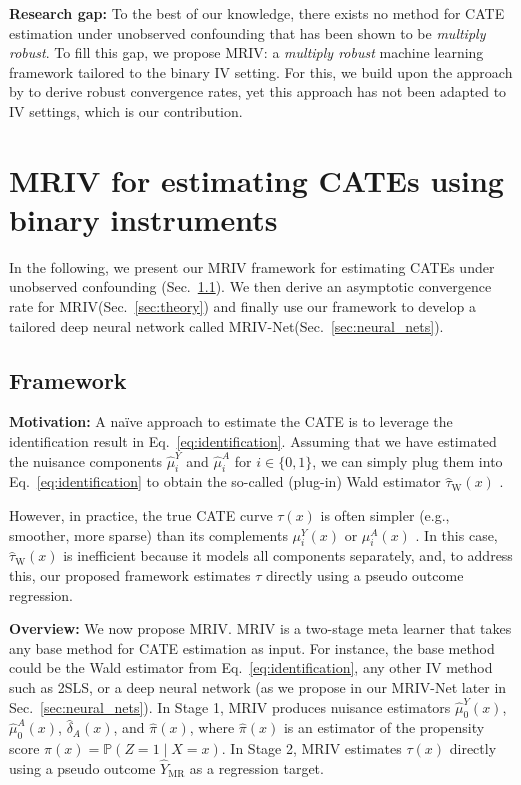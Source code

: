 \documentclass{article} %
\newcommand{\frameworkname}{MRIV\xspace}
\newcommand{\modelname}{\mbox{MRIV-Net}\xspace}
\theoremstyle{definition}
\theoremstyle{plain}
\begin{document}
\textbf{Research gap:} To the best of our knowledge, there exists no method for CATE estimation under unobserved confounding that has been shown to be \emph{multiply robust}. To fill this gap, we propose \frameworkname: a \emph{multiply robust} machine learning framework tailored to the binary IV setting. For this, we build upon the approach by \citet{Kennedy.2022d} to derive robust convergence rates, yet this approach has not been adapted to IV settings, which is our contribution.

\section{\frameworkname for estimating CATEs using binary instruments}

In the following, we present our \frameworkname framework for estimating CATEs under unobserved confounding (Sec.~\ref{sec:methodology}). We then derive an asymptotic convergence rate for \frameworkname (Sec.~\ref{sec:theory}) and finally use our framework to develop a tailored deep neural network called \modelname (Sec.~\ref{sec:neural_nets}). 

\vspace{-0.2cm}

\subsection{Framework}
\label{sec:methodology}

\textbf{Motivation:} A na{\"i}ve approach to estimate the CATE is to leverage the identification result in Eq.~\eqref{eq:identification}. Assuming that we have estimated the nuisance components $\hat{\mu}_i^Y$ and $\hat{\mu}_i^A$ for $i \in \{0,1\}$, we can simply plug them into Eq.~\eqref{eq:identification} to obtain the so-called (plug-in) Wald estimator $\hat{\tau}_{\mathrm{W}}(x)$ \citep{Wald.1940}.

However, in practice, the true CATE curve $\tau(x)$ is often simpler (e.g., smoother, more sparse) than its complements $\mu_i^Y(x)$ or $\mu_i^A(x)$ \citep{Kunzel.2019}. In this case, $\hat{\tau}_{\mathrm{W}}(x)$ is inefficient because it models all components separately, and, to address this, our proposed framework estimates $\tau$ {directly} using a pseudo outcome regression. 

\textbf{Overview:} We now propose \frameworkname. \frameworkname is a two-stage meta learner that takes any base method for CATE estimation as input. For instance, the base method could be the Wald estimator from Eq.~\eqref{eq:identification}, any other IV method such as 2SLS, or a deep neural network (as we propose in our \modelname later in Sec.~\ref{sec:neural_nets}). In Stage 1, \frameworkname produces nuisance estimators $\hat{\mu}_0^Y(x)$, $\hat{\mu}_0^A(x)$, $\hat{\delta}_A(x)$, and $\hat{\pi}(x)$, where $\hat{\pi}(x)$ is an estimator of the propensity score $\pi(x) = \mathbb{P}(Z = 1 \mid X = x)$. In Stage 2, \frameworkname estimates $\tau(x)$ directly using a pseudo outcome $\hat{Y}_{\mathrm{\mathrm{MR}}}$ as a regression target. 
\end{document}
